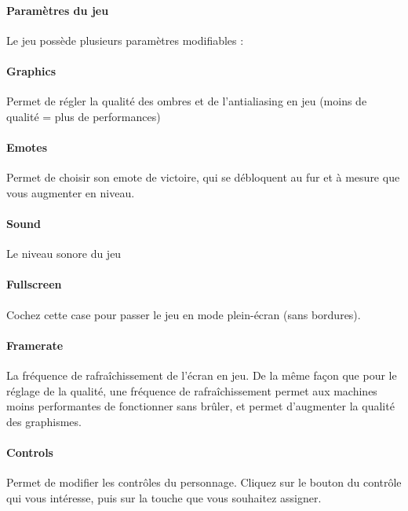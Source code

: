 \paragraph{Paramètres du jeu}

    Le jeu possède plusieurs paramètres modifiables : 
    \paragraph{Graphics} Permet de régler la qualité des ombres et de l'antialiasing en jeu (moins de qualité = plus de performances)
    \paragraph{Emotes} Permet de choisir son emote de victoire, qui se débloquent au fur et à mesure que vous augmenter en niveau.
    \paragraph{Sound} Le niveau sonore du jeu
    \paragraph{Fullscreen} Cochez cette case pour passer le jeu en mode plein-écran (sans bordures).
    \paragraph{Framerate} La fréquence de rafraîchissement de l'écran en jeu. De la même façon que pour le réglage de la qualité, une 
    fréquence de rafraîchissement permet aux machines moins performantes de fonctionner sans brûler, et permet d'augmenter la qualité des graphismes.
    \paragraph{Controls} Permet de modifier les contrôles du personnage. Cliquez sur le bouton du contrôle qui vous intéresse, puis sur 
    la touche que vous souhaitez assigner.